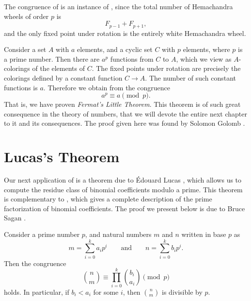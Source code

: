 \begin{example}
  The congruence of  is an instance of , since the total number of Hemachandra wheels of order $p$ is
  \begin{equation*}
    F_{p-1}+F_{p+1},
  \end{equation*}
  and the only fixed point under rotation is the entirely white Hemachandra wheel.
\end{example}

\begin{example}\label{example:fermats-little-theorem}
  Consider a set $A$ with $a$ elements, and a cyclic set $C$ with $p$ elements, where $p$ is a prime number. Then there are $a^p$ functions from $C$ to $A$, which we view as $A$-colorings of the elements of $C$. The fixed points under rotation are precisely the colorings defined by a constant function $C\to A$. The number of such constant functions is $a$. Therefore we obtain from  the congruence
  \begin{equation*}
    a^p\equiv a \pmod{p}.
  \end{equation*}
  That is, we have proven \emph{Fermat's Little Theorem}. This theorem is of such great consequence in the theory of numbers, that we will devote the entire next chapter to it and its consequences. The proof given here was found by Solomon Golomb \cite{golomb1956}.
\end{example}

\section{Lucas's Theorem}

Our next application of  is a theorem due to {\'E}douard Lucas \cite{lucas1878congruences}, which allows us to compute the residue class of binomial coefficients modulo a prime. This theorem is complementary to , which gives a complete description of the prime factorization of binomial coefficients. The proof we present below is due to Bruce Sagan \cite[Theorem 6.5.6]{sagan2020}.

\begin{theorem}
  Consider a prime number $p$, and natural numbers $m$ and $n$ written in base $p$ as
  \begin{equation*}
    m=\sum_{i=0}^ka_ip^i\qquad\text{and}\qquad n=\sum_{i=0}^kb_ip^i.
  \end{equation*}
  Then the congruence
  \begin{equation*}
    \binom{n}{m}\equiv\prod_{i=0}^k\binom{b_i}{a_i}\pmod{p}
  \end{equation*}
  holds. In particular, if $b_i<a_i$ for some $i$, then $\binom{n}{m}$ is divisible by $p$.
\end{theorem}

